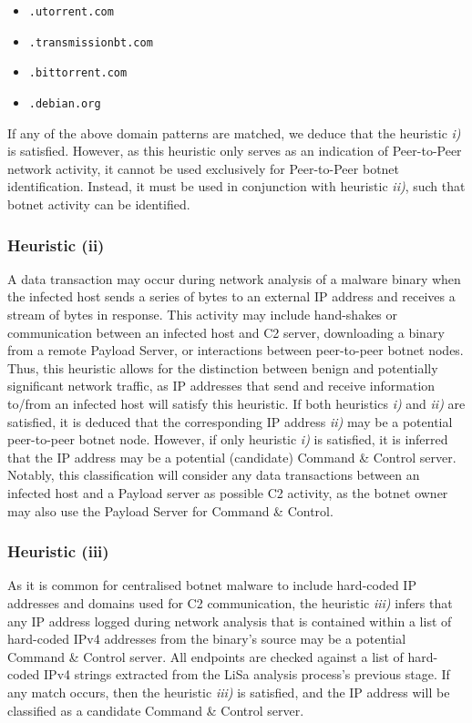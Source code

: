 \begin{itemize}
    \item \texttt{.utorrent.com}
    \item \texttt{.transmissionbt.com}
    \item \texttt{.bittorrent.com}
    \item \texttt{.debian.org}
\end{itemize}

If any of the above domain patterns are matched, we deduce that the heuristic \textit{i)} is satisfied. However, as this heuristic only serves as an indication of Peer-to-Peer network activity, it cannot be used exclusively for Peer-to-Peer botnet identification. Instead, it must be used in conjunction with heuristic \textit{ii)}, such that botnet activity can be identified.

\subsubsection{Heuristic (ii)} A data transaction may occur during network analysis of a malware binary when the infected host sends a series of bytes to an external IP address and receives a stream of bytes in response. This activity may include hand-shakes or communication between an infected host and C2 server, downloading a binary from a remote Payload Server, or interactions between peer-to-peer botnet nodes. Thus, this heuristic allows for the distinction between benign and potentially significant network traffic, as IP addresses that send and receive information to/from an infected host will satisfy this heuristic. If both heuristics \textit{i)} and \textit{ii)} are satisfied, it is deduced that the corresponding IP address \textit{ii)} may be a potential peer-to-peer botnet node. However, if only heuristic \textit{i)} is satisfied, it is inferred that the IP address may be a potential (candidate) Command \& Control server. Notably, this classification will consider any data transactions between an infected host and a Payload server as possible C2 activity, as the botnet owner may also use the Payload Server for Command \& Control.

\subsubsection{Heuristic (iii)} As it is common for centralised botnet malware to include hard-coded IP addresses and domains used for C2 communication, the heuristic \textit{iii)} infers that any IP address logged during network analysis that is contained within a list of hard-coded IPv4 addresses from the binary's source may be a potential Command \& Control server. All endpoints are checked against a list of hard-coded IPv4 strings extracted from the LiSa analysis process's previous stage. If any match occurs, then the heuristic \textit{iii)} is satisfied, and the IP address will be classified as a candidate Command \& Control server.

